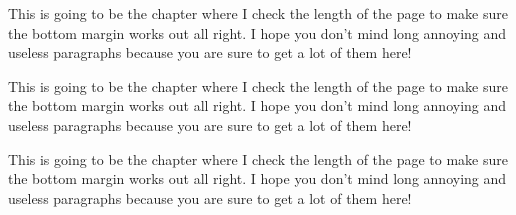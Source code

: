 This is going to be the chapter where I check the length of the page
to make sure the bottom margin works out all right.  I hope you don't
mind long annoying and useless paragraphs because you are sure to get
a lot of them here!

This is going to be the chapter where I check the length of the page
to make sure the bottom margin works out all right.  I hope you don't
mind long annoying and useless paragraphs because you are sure to get
a lot of them here!

This is going to be the chapter where I check the length of the page
to make sure the bottom margin works out all right.  I hope you don't
mind long annoying and useless paragraphs because you are sure to get
a lot of them here!
